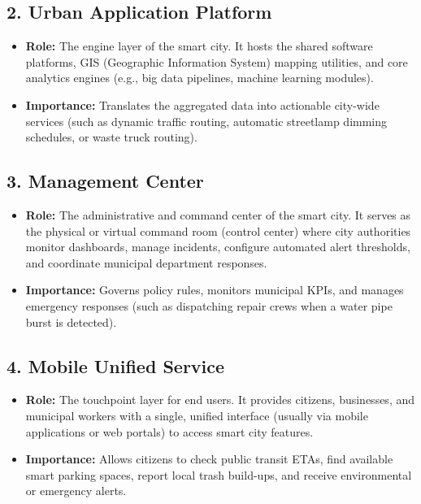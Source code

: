 \subsection{2. Urban Application Platform}
\begin{itemize}
  \item   \textbf{Role:} The engine layer of the smart city. It hosts the shared software platforms, GIS (Geographic Information System) mapping utilities, and core analytics engines (e.g., big data pipelines, machine learning modules).
  \item   \textbf{Importance:} Translates the aggregated data into actionable city-wide services (such as dynamic traffic routing, automatic streetlamp dimming schedules, or waste truck routing).
\end{itemize}

\subsection{3. Management Center}
\begin{itemize}
  \item   \textbf{Role:} The administrative and command center of the smart city. It serves as the physical or virtual command room (control center) where city authorities monitor dashboards, manage incidents, configure automated alert thresholds, and coordinate municipal department responses.
  \item   \textbf{Importance:} Governs policy rules, monitors municipal KPIs, and manages emergency responses (such as dispatching repair crews when a water pipe burst is detected).
\end{itemize}

\subsection{4. Mobile Unified Service}
\begin{itemize}
  \item   \textbf{Role:} The touchpoint layer for end users. It provides citizens, businesses, and municipal workers with a single, unified interface (usually via mobile applications or web portals) to access smart city features.
  \item   \textbf{Importance:} Allows citizens to check public transit ETAs, find available smart parking spaces, report local trash build-ups, and receive environmental or emergency alerts.
\end{itemize}

